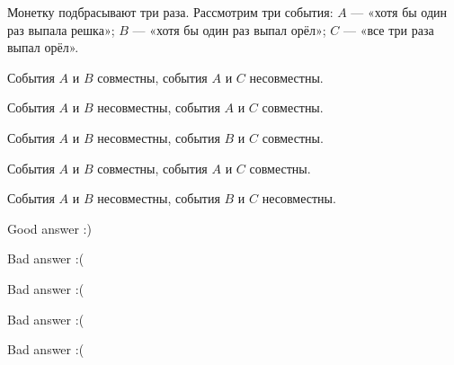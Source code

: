 
\begin{question}
Монетку подбрасывают три раза. Рассмотрим три события: \(A\) — «хотя
бы один раз выпала решка»; \(B\) — «хотя бы один раз выпал орёл»;
\(C\) — «все три раза выпал орёл».
\begin{answerlist}
  \item События \(A\) и \(B\) совместны, события \(A\) и \(C\) несовместны.
  \item События \(A\) и \(B\) несовместны, события \(A\) и \(C\) совместны.
  \item События \(A\) и \(B\) несовместны, события \(B\) и \(C\) совместны.
  \item События \(A\) и \(B\) совместны, события \(A\) и \(C\) совместны.
  \item События \(A\) и \(B\) несовместны, события \(B\) и \(C\) несовместны.
\end{answerlist}
\end{question}

\begin{solution}
\begin{answerlist}
  \item Good answer :)
  \item Bad answer :(
  \item Bad answer :(
  \item Bad answer :(
  \item Bad answer :(
\end{answerlist}
\end{solution}

